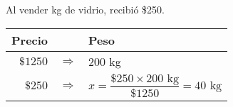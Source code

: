 Al vender \fillin[4][1cm] kg de vidrio, recibió \$250.

\begin{solutionbox}{2.3cm}\scriptsize
    \begin{tabular}{r>{\centering}p{0.2cm}l}
        \textbf{Precio} &               & \textbf{Peso}                                                  \\
        \hline
        $\$1250$        & $\Rightarrow$ & $200$ kg                                                       \\
        $\$250$         & $\Rightarrow$ & $x=\dfrac{\$250  \times 200 \text{ kg}}{\$1250}=40 \text{ kg}$ \\
    \end{tabular}
\end{solutionbox}

